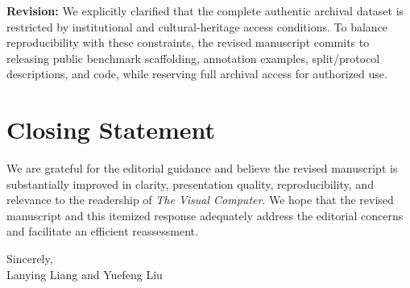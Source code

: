 \documentclass[11pt]{article}
\begin{document}
\textbf{Revision:} We explicitly clarified that the complete authentic archival dataset is restricted by institutional and cultural-heritage access conditions. To balance reproducibility with these constraints, the revised manuscript commits to releasing public benchmark scaffolding, annotation examples, split/protocol descriptions, and code, while reserving full archival access for authorized use.

\section{Closing Statement}

We are grateful for the editorial guidance and believe the revised manuscript is substantially improved in clarity, presentation quality, reproducibility, and relevance to the readership of \textit{The Visual Computer}. We hope that the revised manuscript and this itemized response adequately address the editorial concerns and facilitate an efficient reassessment.

\vspace{1em}

Sincerely,\\
Lanying Liang and Yuefeng Liu
\end{document}
